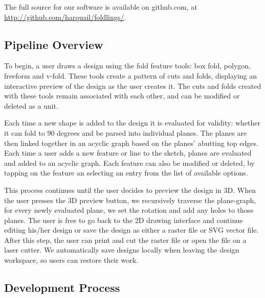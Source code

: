 The full source for our software is available on github.com, at
\url{http://github.com/harquail/foldlings/}.

\subsection{Pipeline Overview}\label{pipeline-overview}

To begin, a user draws a design using the fold feature tools: box fold,
polygon, freeform and v-fold. These tools create a pattern of cuts and
folds, displaying an interactive preview of the design as the user
creates it. The cuts and folds created with these tools remain
associated with each other, and can be modified or deleted as a unit.

Each time a new shape is added to the design it is evaluated for
validity: whether it can fold to 90 degrees and be parsed into
individual planes. The planes are then linked together in an acyclic
graph based on the planes' abutting top edges. Each time a user adds a
new feature or line to the sketch, planes are evaluated and added to an
acyclic graph. Each feature can also be modified or deleted, by tapping
on the feature an selecting an entry from the list of available options.

This process continues until the user decides to preview the design in
3D. When the user presses the 3D preview button, we recursively traverse
the plane-graph, for every newly evaluated plane, we set the rotation
and add any holes to those planes. The user is free to go back to the 2D
drawing interface and continue editing his/her design or save the design
as either a raster file or SVG vector file. After this step, the user
can print and cut the raster file or open the file on a laser cutter. We
automatically save designs locally when leaving the design workspace, so
users can restore their work.

\subsection{Development Process}\label{development-process}
